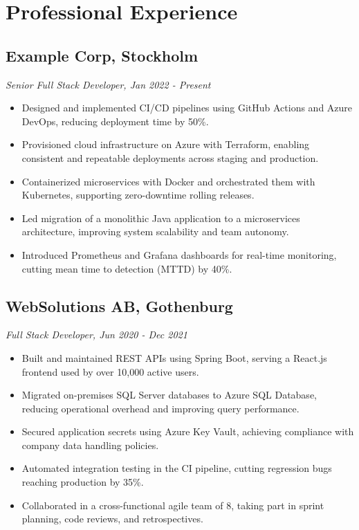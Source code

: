 \documentclass[a4paper,10pt]{article}
\begin{document}
\section*{Professional Experience}
\subsection*{Example Corp, Stockholm}
\textit{Senior Full Stack Developer, Jan 2022 - Present}
\begin{itemize}[noitemsep]
\item Designed and implemented CI/CD pipelines using GitHub Actions and Azure DevOps, reducing deployment time by 50\%.
\item Provisioned cloud infrastructure on Azure with Terraform, enabling consistent and repeatable deployments across staging and production.
\item Containerized microservices with Docker and orchestrated them with Kubernetes, supporting zero-downtime rolling releases.
\item Led migration of a monolithic Java application to a microservices architecture, improving system scalability and team autonomy.
\item Introduced Prometheus and Grafana dashboards for real-time monitoring, cutting mean time to detection (MTTD) by 40\%.
\end{itemize}

\subsection*{WebSolutions AB, Gothenburg}
\textit{Full Stack Developer, Jun 2020 - Dec 2021}
\begin{itemize}[noitemsep]
\item Built and maintained REST APIs using Spring Boot, serving a React.js frontend used by over 10,000 active users.
\item Migrated on-premises SQL Server databases to Azure SQL Database, reducing operational overhead and improving query performance.
\item Secured application secrets using Azure Key Vault, achieving compliance with company data handling policies.
\item Automated integration testing in the CI pipeline, cutting regression bugs reaching production by 35\%.
\item Collaborated in a cross-functional agile team of 8, taking part in sprint planning, code reviews, and retrospectives.
\end{itemize}
\end{document}
